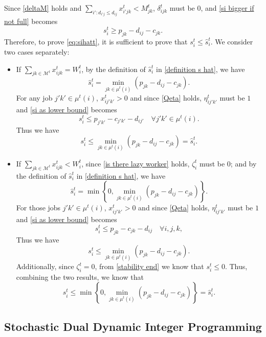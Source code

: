 \documentclass[trsc,nonblindrev]{informs3noheader}
\begin{document}
Since \eqref{deltaM} holds and $\sum_{i': d_{i'j} \le d_{ij}} x_{i'jk}^t < M_{jk}^t$, $\delta_{ijk}^t$ must be 0, and \eqref{si bigger if not full} becomes
\[
s_i^t \ge p_{jk} - d_{ij} - c_{jk}. 
\]
Therefore, to prove \eqref{eq:sihatt}, it is sufficient to prove that $s_i^t \leq \hat{s}_i^t$. We consider two cases separately:
\begin{itemize}
    \item If $\sum_{jk\in\mathcal{M}^t}x_{ijk}^t=W_i^t$, by the definition of $\hat{s}_i^t$ in \eqref{definition s hat}, we have
    \[
    \hat{s}_i^t = \min_{jk\in \mu^t(i)} \left(p_{jk}-d_{ij}-c_{jk}\right).
    \]
    For any job $j'k'\in \mu^t(i)$, $x_{ij'k'}^t>0$ and since \eqref{Qeta} holds, $\eta_{ij'k'}^t$ must be $1$ and \eqref{si as lower bound} becomes 
    \[
    s_i^t \leq p_{j'k'} - c_{j'k'} - d_{ij'} \quad \forall j'k' \in \mu^t(i).
    \]
    Thus we have 
    \[
    s_i^t \leq \min_{jk\in \mu^t(i)} \left(p_{jk}-d_{ij}-c_{jk}\right) = \hat{s}_i^t.
    \]

    \item If $\sum_{jk\in\mathcal{M}^t}x_{ijk}^t<W_i^t$, since \eqref{is there lazy worker} holds, $\zeta_i^t$ must be $0$; and by the definition of $\hat{s}_i^t$ in \eqref{definition s hat}, we have
    \[
    \hat{s}_i^t = \min\left\{0, \min_{jk\in \mu^t(i)} \left(p_{jk}-d_{ij}-c_{jk}\right)\right\}.
    \]
    For those jobs $j'k'\in \mu^t(i)$, $x_{ij'k'}^t>0$ and since \eqref{Qeta} holds, $\eta_{ij'k'}^t$ must be $1$ and \eqref{si as lower bound} becomes 
    \[
    s_i^t \leq p_{jk} - c_{jk} - d_{ij} \quad \forall i,j,k,
    \]
    Thus we have 
    \[
    s_i^t \leq \min_{jk\in \mu^t(i)} \left(p_{jk}-d_{ij}-c_{jk}\right).
    \]
    Additionally, since $\zeta_i^t=0$, from \eqref{stability end} we know that $s_i^t \leq 0$. Thus, combining the two results, we know that
    \[
    s_i^t \leq \min\left\{0, \min_{jk\in \mu^t(i)} \left(p_{jk}-d_{ij}-c_{jk}\right)\right\} = \hat{s}_i^t.
    \]
\end{itemize}


\newpage

\subsection{Stochastic Dual Dynamic Integer Programming\citep{zou2019stochastic}}\label{sec:sddip}
\end{document}
